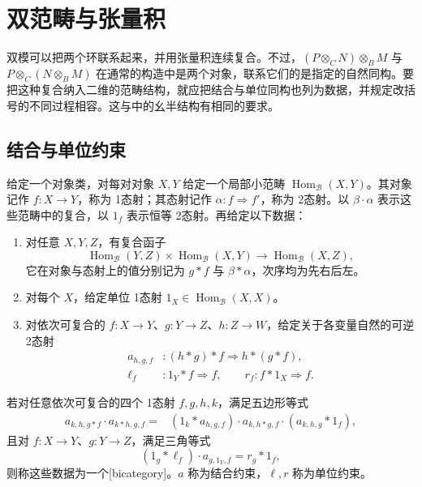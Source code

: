 
\section{双范畴与张量积}
\label{b4:sec:F02}

双模可以把两个环联系起来，并用张量积连续复合。不过，\((P\otimes_C N)\otimes_B M\) 与 \(P\otimes_C(N\otimes_B M)\) 在通常的构造中是两个对象，联系它们的是指定的自然同构。要把这种复合纳入二维的范畴结构，就应把结合与单位同构也列为数据，并规定改括号的不同过程相容。这与中的幺半结构有相同的要求。

\subsection{结合与单位约束}
\label{b4:subsec:F02:01}

\begin{definition}\label{b4:def:F-bicategory}
	给定一个对象类，对每对对象 \(X,Y\) 给定一个局部小范畴 \(\operatorname{Hom}_{\mathcal B}(X,Y)\)。其对象记作 \(f:X\rightarrow Y\)，称为 1态射；其态射记作 \(\alpha:f\Rightarrow f'\)，称为 2态射。以 \(\beta\cdot\alpha\) 表示这些范畴中的复合，以 \(1_f\) 表示恒等 2态射。再给定以下数据：
	\begin{enumerate}
		\item 对任意 \(X,Y,Z\)，有复合函子
			\[
				\operatorname{Hom}_{\mathcal B}(Y,Z)\times \operatorname{Hom}_{\mathcal B}(X,Y) \longrightarrow\operatorname{Hom}_{\mathcal B}(X,Z),
			\]
			它在对象与态射上的值分别记为 \(g*f\) 与 \(\beta*\alpha\)，次序均为先右后左。
		\item 对每个 \(X\)，给定单位 1态射 \(1_X\in\operatorname{Hom}_{\mathcal B}(X,X)\)。
		\item 对依次可复合的 \(f:X\rightarrow Y\)、\(g:Y\rightarrow Z\)、\(h:Z\rightarrow W\)，给定关于各变量自然的可逆 2态射
			\[
				\begin{aligned}
					a_{h,g,f}&:(h*g)*f\Longrightarrow h*(g*f),\\
					\ell_f&:1_Y*f\Longrightarrow f, \qquad r_f:f*1_X\Longrightarrow f.
				\end{aligned}
			\]
	\end{enumerate}
	若对任意依次可复合的四个 1态射 \(f,g,h,k\)，满足五边形等式
	\begin{equation}\label{b4:eq:F-bicategory-pentagon}
		\begin{aligned}
			a_{k,h,g*f}\cdot a_{k*h,g,f} ={}&(1_k*a_{h,g,f})\cdot a_{k,h*g,f} \cdot(a_{k,h,g}*1_f),
		\end{aligned}
	\end{equation}
	且对 \(f:X\rightarrow Y\)、\(g:Y\rightarrow Z\)，满足三角等式
	\begin{equation}\label{b4:eq:F-bicategory-triangle}
		(1_g*\ell_f)\cdot a_{g,1_Y,f}=r_g*1_f,
	\end{equation}
	则称这些数据为一个[bicategory]。\(a\) 称为结合约束，\(\ell,r\) 称为单位约束。
\end{definition}

